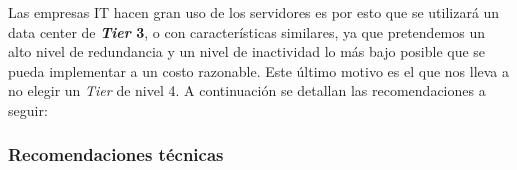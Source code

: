   Las empresas IT hacen gran uso de los servidores es por esto que se utilizará un data center de \textbf{\textit{Tier} 3}, o con características similares, ya que pretendemos un alto nivel de redundancia y un nivel de inactividad lo más bajo posible que se pueda implementar a un costo razonable.
  Este último motivo es el que nos lleva a no elegir un \textit{Tier} de nivel 4.
  A continuación se detallan las recomendaciones a seguir:
 

 
  \subsubsection{Recomendaciones técnicas}
  
